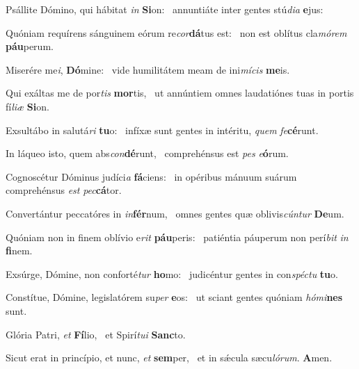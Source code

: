 \item Psállite Dómino, qui hábitat \textit{in} \textbf{Si}on:~\psstar{} annuntiáte inter gentes stú\textit{dia} \textbf{e}jus:
\item Quóniam requírens sánguinem eórum re\textit{cor}\textbf{dá}tus est:~\psstar{} non est oblítus cla\textit{mórem} \textbf{páu}perum.
\item Miserére me\textit{i}, \textbf{Dó}mine:~\psstar{} vide humilitátem meam de ini\textit{mícis} \textbf{me}is.
\item Qui exáltas me de por\textit{tis} \textbf{mor}tis,~\psstar{} ut annúntiem omnes laudatiónes tuas in portis fí\textit{liæ} \textbf{Si}on.
\item Exsultábo in salutá\textit{ri} \textbf{tu}o:~\psstar{} infíxæ sunt gentes in intéritu, \textit{quem} \textit{fe}\textbf{cé}runt.
\item In láqueo isto, quem abs\textit{con}\textbf{dé}runt,~\psstar{} comprehénsus est \textit{pes} \textit{e}\textbf{ó}rum.
\item Cognoscétur Dóminus judíci\textit{a} \textbf{fá}ciens:~\psstar{} in opéribus mánuum suárum comprehénsus \textit{est} \textit{pec}\textbf{cá}tor.
\item Convertántur peccatóres in \textit{in}\textbf{fér}num,~\psstar{} omnes gentes quæ oblivis\textit{cúntur} \textbf{De}um.
\item Quóniam non in finem oblívio e\textit{rit} \textbf{páu}peris:~\psstar{} patiéntia páuperum non perí\textit{bit} \textit{in} \textbf{fi}nem.
\item Exsúrge, Dómine, non conforté\textit{tur} \textbf{ho}mo:~\psstar{} judicéntur gentes in con\textit{spéctu} \textbf{tu}o.
\item Constítue, Dómine, legislatórem su\textit{per} \textbf{e}os:~\psstar{} ut sciant gentes quóniam \textit{hómi}\textbf{nes} sunt.
\item Glória Patri, \textit{et} \textbf{Fí}lio,~\psstar{} et Spirí\textit{tui} \textbf{Sanc}to.
\item Sicut erat in princípio, et nunc, \textit{et} \textbf{sem}per,~\psstar{} et in sǽcula sæcu\textit{lórum}. \textbf{A}men.
